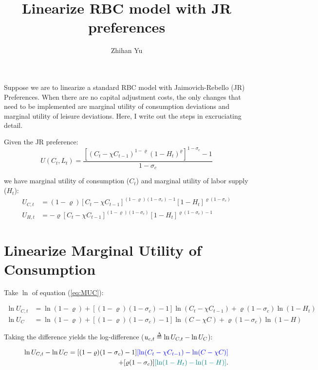 \documentclass[]{article}
\title{Linearize RBC model with JR preferences}
\author{Zhihan Yu}
\begin{document}
\def\delequal{\mathrel{\ensurestackMath{\stackon[1pt]{=}{\scriptstyle\Delta}}}}
\maketitle

Suppose we are to linearize a standard RBC model with Jaimovich-Rebello (JR) Preferences. When there are no capital adjustment costs, the only changes that need to be implemented are marginal utility of consumption deviations and marginal utility of leisure deviations. Here, I write out the steps in excruciating detail.

Given the JR preference: \[ U(C_t,L_t) = \frac{[(C_t - \chi C_{t-1})^{1-\varrho} (1-H_t)^\varrho]^{1-\sigma_c} - 1}{1-\sigma_c} \]

we have marginal utility of consumption ($C_t$) and marginal utility of labor supply ($H_t$):
\begin{align}
	U_{C,t} &= (1-\varrho)[C_t-\chi C_{t-1}]^{(1-\varrho)(1-\sigma_c)-1} [1-H_t]^{\varrho(1-\sigma_c)} \label{eq:MUC}\\
	U_{H,t} &= -\varrho[C_t-\chi C_{t-1}]^{(1-\varrho)(1-\sigma_c)} [1-H_t]^{\varrho(1-\sigma_c)-1} \label{eq:MUH}
\end{align}

\section{Linearize Marginal Utility of Consumption}
Take $\ln$ of equation (\ref{eq:MUC}):

\begin{align*}
	\ln U_{C,t} &= \ln (1-\varrho) + [(1-\varrho)(1-\sigma_c)-1] \ln(C_t-\chi C_{t-1}) + \varrho (1-\sigma_c)\ln(1-H_t)\\
	\ln U_{C} &= \ln (1-\varrho) + [(1-\varrho)(1-\sigma_c)-1] \ln(C-\chi C_{}) + \varrho (1-\sigma_c)\ln(1-H)
\end{align*}

\noindent Taking the difference yields the log-difference ($u_{c,t} \delequal \ln U_{C,t} - \ln U_{C}$):

\begin{equation*}
	\begin{split}
	\ln U_{C,t} - \ln U_{C} = [(1-\varrho)(1-\sigma_c)-1] {\color{blue}[\ln(C_t-\chi C_{t-1}) -  \ln(C-\chi C)]} \\ 
	+ [\varrho (1-\sigma_c)] {\color{teal}[\ln(1-H_t) -  \ln(1-H)]}.
\end{split}
\end{equation*}
\end{document}
